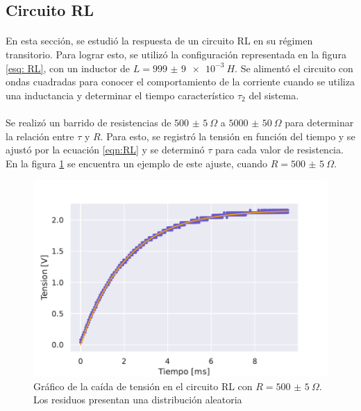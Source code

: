 \subsection{Circuito RL}\label{sec: RL}
\paragraph{}
En esta sección, se estudió la respuesta de un circuito RL en su régimen transitorio. Para lograr esto, se utilizó la configuración representada en la figura \ref{esq: RL}, con un inductor de $L=\SI{999(9)e-3}{H}$. Se alimentó el circuito con ondas cuadradas para conocer el comportamiento de la corriente cuando se utiliza una inductancia y determinar el tiempo característico $\tau_2$ del sistema. 
\paragraph{}
Se realizó un barrido de resistencias de $\SI{500(5)}{\Omega}$ a $\SI{5000(50)}{\Omega}$ para determinar la relación entre $\tau$ y $R$. Para esto, se registró la tensión en función del tiempo y se ajustó por la ecuación \eqref{eqn:RL} y se determinó $\tau$ para cada valor de resistencia. En la figura \ref{fig:RL 500} se encuentra un ejemplo de este ajuste, cuando $R=\SI{500(5)}{\Omega}$.
\begin{figure}[H]
    \centering
    \includegraphics[scale= 0.7]{Figuras/RL/RL 500.pdf}
    \caption{Gráfico de la caída de tensión en el circuito RL con $R=\SI{500(5)}{\Omega}$. Los residuos presentan una distribución aleatoria}
    \label{fig:RL 500}
\end{figure}
